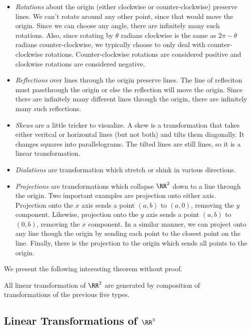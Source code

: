 \documentclass[fleqn]{report}
\begin{document}
\begin{itemize}
\item \emph{Rotations} about the origin (either clockwise or
counter-clockwise) preserve lines. We can't rotate around any
other point, since that would move the origin. Since we can
choose any angle, there are infinitely many such rotations.
Also, since rotating by $\theta$ radians clockwise is the same
as $2\pi - \theta$ radians counter-clockwise, we typically
choose to only deal with counter-clockwise rotations.
Counter-clockwise rotations are considered positive and
clockwise rotations are considered negative.
\item \emph{Reflections} over lines through the origin 
preserve lines. The line of refleciton must passthrough the
origin or else the reflection will move the origin. Since
there are infinitely many different lines through the origin,
there are infinitely many such reflections.
\item \emph{Skews} are a little tricker to visualize. A skew
is a transformation that takes either veritcal or horizontal
lines (but not both) and tilts them diagonally. It changes
squares into parallelograms. The tilted lines are still
lines, so it is a linear transformation.
\item \emph{Dialations} are transformation which stretch or
shink in various directions. 
\item \emph{Projections} are transformations which collapse
$\RR^2$ down to a line through the origin. Two important
examples are projection onto either axis. Projection onto the
$x$ axis sends a point $(a,b)$ to $(a,0)$, removing the $y$
component. Likewise, projection onto the $y$ axis sends a point
$(a,b)$ to $(0,b)$, removing the $x$ component. In a similar
manner, we can project onto any line though the origin by
sending each point to the closest point on the line. Finally,
there is the projection to the origin which sends all points to
the origin.
\end{itemize}

We present the following interesting theorem without proof.
\begin{thm}
All linear transformation of $\RR^2$ are generated by
composition of transformations of the previous five types.
\end{thm}

\subsection{Linear Transformations of $\RR^3$}
\label{transformations-r3}
\end{document}
